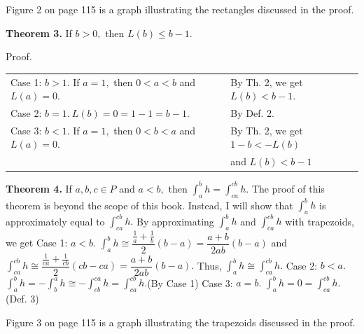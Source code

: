 Figure 2 on page 115 is a graph illustrating the rectangles discussed in the proof.\nl

\textbf{Theorem 3.} If $b > 0,$ then $L(b) \leq b - 1.$ \nl

Proof.\nl
\begin{tabular}{l l}
Case 1: $b > 1.$  If $a = 1,$ then $0 < a < b$ and $L(a) = 0.$&By Th. 2, we get $L(b) < b - 1.$\\
Case 2: $b = 1.~L(b) = 0 = 1 - 1 = b - 1.$&By Def. 2.\\
Case 3: $b < 1.$ If $a = 1,$ then $0<b<a$ and $L(a)=0.$&By Th. 2, we get $1 - b < -L(b)$\\
&and $L(b) < b - 1$\\
\end{tabular}\nl



\textbf{Theorem 4.} If $a, b, c \in P$ and $a < b,$ then $\int_{a}^{b}h = \int_{ca}^{cb} h.$\nl
The proof of this theorem is beyond the scope of this book.  Instead, I will show that $\int_{a}^{b} h$ is
approximately equal to $\int_{ca}^{cb} h.$  By approximating $\int_{a}^{b} h$ and $\int_{ca}^{cb} h$ with trapezoids, we get\nl
Case 1: $a < b.$ $\int_{a}^{b} h \cong \dfrac{\frac{1}{a} + \frac{1}{b}}{2}(b - a) = \dfrac{a + b}{2ab}(b-a)$
and\nl
$\int_{ca}^{cb} h \cong \dfrac{\frac{1}{ca} + \frac{1}{cb}}{2}(cb - ca) = \dfrac{a + b}{2ab}(b - a).$  Thus,
$\int_{a}^{b} h \cong \int_{ca}^{cb} h.$\nl
Case 2: $b < a.$  $\int_{a}^{b} h = - \int_{b}^{a} h \cong -\int_{cb}^{ca} h = \int_{ca}^{cb} h.$\hfill (By Case 1)\nl
Case 3: $a = b.$  $\int_{a}^{b} h = 0 = \int_{ca}^{cb} h.$\hfill(Def. 3)\nl

Figure 3 on page 115 is a graph illustrating the trapezoids discussed in the proof.\nl





